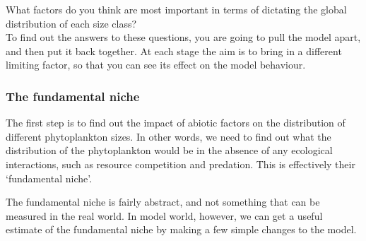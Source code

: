 \documentclass[11pt,fleqn]{book} %
\begin{document}
What factors do you think are most important in terms of dictating the global distribution of each size class?
\\To find out the answers to these questions, you are going to pull the model apart, and then put it back together. At each stage the aim is to bring in a different limiting factor, so that you can see its effect on the model behaviour.


\subsubsection*{The fundamental niche}

The first step is to find out the impact of abiotic factors on the distribution of different phytoplankton sizes. In other words, we need to find out what the distribution of the phytoplankton would be in the absence of any ecological interactions, such as resource competition and predation. This is effectively their `fundamental niche'.

The fundamental niche is fairly abstract, and not something that can be measured in the real world. In model world, however, we can get a useful estimate of the fundamental niche by making a few simple changes to the model.
\end{document}
